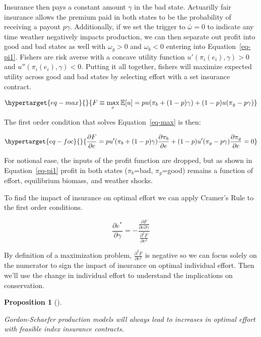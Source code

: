 \documentclass[
  letterpaper,
  DIV=11,
  numbers=noendperiod]{scrartcl}
\theoremstyle{plain}
\newtheorem{proposition}{Proposition}[section]
\theoremstyle{plain}
\theoremstyle{remark}
\begin{document}
Insurance then pays a constant amount \(\gamma\) in the bad state.
Actuarilly fair insurance allows the premium paid in both states to be
the probability of receiving a payout \(p\gamma\). Additionally, if we
set the trigger to \(\bar\omega=0\) to indicate any time weather
negatively impacts production, we can then separate out profit into good
and bad states as well with \(\omega_g>0\) and \(\omega_b<0\) entering
into Equation~\ref{eq-pi1}. Fishers are risk averse with a concave
utility function \(u'(\pi_i(e_i),\gamma)>0\) and
\(u''(\pi_i(e_i),\gamma)<0\). Putting it all together, fishers will
maximize expected utility across good and bad states by selecting effort
with a set insurance contract.

\begin{equation}\protect\hypertarget{eq-max}{}{
F\equiv\max_{e}\mathbb{E}[u]=pu(\pi_b+(1-p)\gamma)+(1-p)u(\pi_g-p\gamma)
}\label{eq-max}\end{equation}

The first order condition that solves Equation~\ref{eq-max} is then:

\begin{equation}\protect\hypertarget{eq-foc}{}{
\frac{\partial F}{\partial e}=pu'(\pi_b+(1-p)\gamma)\frac{\partial \pi_b}{\partial e}+(1-p)u'(\pi_g-p\gamma)\frac{\partial \pi_g}{\partial e}=0
}\label{eq-foc}\end{equation}

For notional ease, the inputs of the profit function are dropped, but as
shown in Equation~\ref{eq-pi1} profit in both states (\(\pi_b\)=bad,
\(\pi_g\)=good) remains a function of effort, equilibrium biomass, and
weather shocks.

To find the impact of insurance on optimal effort we can apply Cramer's
Rule to the first order conditions.

\[
\frac{\partial e^*}{\partial \gamma}=-\frac{\frac{\partial F}{\partial e \partial \gamma}}{\frac{\partial^2 F}{\partial e^2}}
\]

By definition of a maximization problem,
\(\frac{\partial^2 F}{\partial e^2}\) is negative so we can focus solely
on the numerator to sign the impact of insurance on optimal individual
effort. Then we'll use the change in individual effort to understand the
implications on conservation.

\begin{proposition}[]\protect\hypertarget{prp-cp}{}\label{prp-cp}

Gordon-Schaefer production models will always lead to increases in
optimal effort with feasible index insurance contracts.

\end{proposition}
\end{document}
